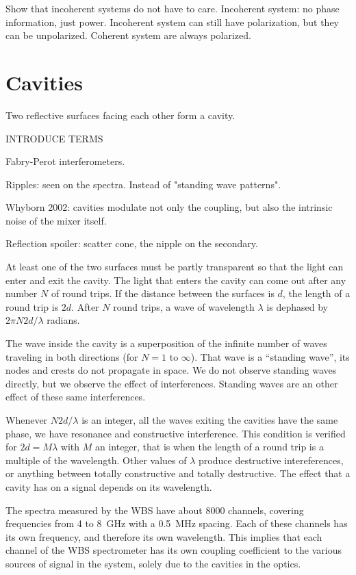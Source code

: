 Show that incoherent systems do not have to care.
Incoherent system: no phase information, just power.
Incoherent system can still have polarization, but they can be unpolarized.
Coherent system are always polarized.






\section{Cavities}
Two reflective surfaces facing each other form a cavity.

INTRODUCE TERMS

Fabry-Perot interferometers.

Ripples: seen on the spectra.  Instead of "standing wave patterns".

Whyborn 2002: cavities modulate not only the coupling, but also the intrinsic noise of the mixer itself.

Reflection spoiler: scatter cone, the nipple on the secondary.



At least one of the two surfaces must be partly transparent so that the light can enter and exit the cavity.
The light that enters the cavity can come out after any number $N$ of round trips.
If the distance between the surfaces is $d$, the length of a round trip is $2d$.
After $N$ round trips, a wave of wavelength $\lambda$ is dephased by $2\pi N2d/\lambda$ radians.

The wave inside the cavity is a superposition of the infinite number of waves traveling in both directions (for $N=1$ to $\infty$).
That wave is a ``standing wave'', its nodes and crests do not propagate in space.
We do not observe standing waves directly, but we observe the effect of interferences.
Standing waves are an other effect of these same interferences.

Whenever $N2d/\lambda$ is an integer, all the waves exiting the cavities have the same phase, we have resonance and constructive interference.
This condition is verified for $2d=M\lambda$ with $M$ an integer, that is when the length of a round trip is a multiple of the wavelength.
Other values of $\lambda$ produce destructive intereferences, or anything between totally constructive and totally destructive.
The effect that a cavity has on a signal depends on its wavelength.

The spectra measured by the WBS have about 8000 channels, covering frequencies from 4 to \SI{8}{\giga\hertz} with a \SI{0.5}{\mega\hertz} spacing.
Each of these channels has its own frequency, and therefore its own wavelength.
This implies that each channel of the WBS spectrometer has its own coupling coefficient to the various sources of signal in the system, solely due to the cavities in the optics.

